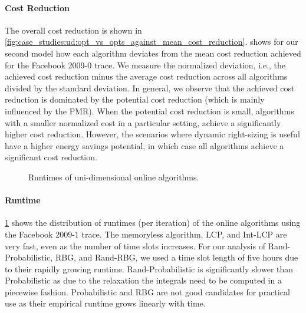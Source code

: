 \paragraph{Cost Reduction} The overall cost reduction is shown in \cref{fig:case_studies:ud:opt_vs_opts_against_mean_cost_reduction}.  shows for our second model how each algorithm deviates from the mean cost reduction achieved for the Facebook 2009-0 trace. We measure the normalized deviation, i.e., the achieved cost reduction minus the average cost reduction across all algorithms divided by the standard deviation. In general, we observe that the achieved cost reduction is dominated by the potential cost reduction (which is mainly influenced by the PMR). When the potential cost reduction is small, algorithms with a smaller normalized cost in a particular setting, achieve a significantly higher cost reduction. However, the scenarios where dynamic right-sizing is useful have a higher energy savings potential, in which case all algorithms achieve a significant cost reduction.

\begin{figure}
    \begin{subfigure}[b]{.5175\linewidth}
    \resizebox{\textwidth}{!}{}
    \end{subfigure}
    \begin{subfigure}[b]{.4825\linewidth}
    \resizebox{\textwidth}{!}{}
    \end{subfigure}
    \caption{Runtimes of uni-dimensional online algorithms.}\label{fig:case_studies:ud:runtimes}
\end{figure}

\paragraph{Runtime} \cref{fig:case_studies:ud:runtimes} shows the distribution of runtimes (per iteration) of the online algorithms using the Facebook 2009-1 trace. The memoryless algorithm, LCP, and Int-LCP are very fast, even as the number of time slots increases. For our analysis of Rand-Probabilistic, RBG, and Rand-RBG, we used a time slot length of five hours due to their rapidly growing runtime. Rand-Probabilistic is significantly slower than Probabilistic as due to the relaxation the integrals need to be computed in a piecewise fashion. Probabilistic and RBG are not good candidates for practical use as their empirical runtime grows linearly with time.

